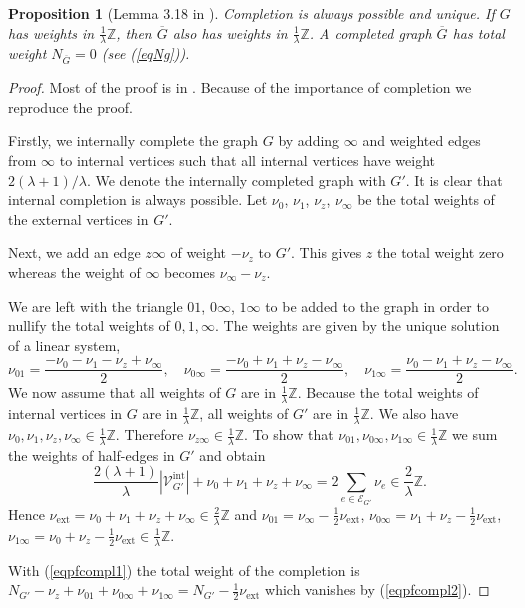 \documentclass[oneside]{amsart}
\newcommand{\ZZ}{{\mathbb Z}}
\newcommand{\Gg}{{\overline{G}}}
\newcommand{\sE}{\mathcal{E}}
\newcommand{\sV}{\mathcal{V}}
\theoremstyle{plain}
\newtheorem{prop}[thm]{Proposition}
\begin{document}
\begin{prop}[Lemma 3.18 in \cite{gf}]\label{propcompl}
Completion is always possible and unique. If $G$ has weights in $\frac{1}{\lambda}\ZZ$, then $\Gg$ also has weights in $\frac{1}{\lambda}\ZZ$. A completed graph $\Gg$ has total weight $N_\Gg=0$
(see (\ref{eqNg})).
\end{prop}
\begin{proof}
Most of the proof is in \cite{gf}. Because of the importance of completion we reproduce the proof.

Firstly, we internally complete the graph $G$ by adding $\infty$ and weighted edges from $\infty$ to internal vertices such that all internal vertices have weight $2(\lambda+1)/\lambda$.
We denote the internally completed graph with $G'$. It is clear that internal completion is always possible.
Let $\nu_0$, $\nu_1$, $\nu_z$, $\nu_\infty$ be the total weights of the external vertices in $G'$.

Next, we add an edge $z\infty$ of weight $-\nu_z$ to $G'$. This gives $z$ the total weight zero whereas the weight of $\infty$ becomes $\nu_\infty-\nu_z$.

We are left with the triangle $01$, $0\infty$, $1\infty$ to be added to the graph in order to nullify the total weights of $0,1,\infty$.
The weights are given by the unique solution of a linear system,
\begin{equation}\label{eqpfcompl1}
\nu_{01}=\frac{-\nu_0-\nu_1-\nu_z+\nu_\infty}{2},\quad\nu_{0\infty}=\frac{-\nu_0+\nu_1+\nu_z-\nu_\infty}{2},\quad\nu_{1\infty}=\frac{\nu_0-\nu_1+\nu_z-\nu_\infty}{2}.
\end{equation}
We now assume that all weights of $G$ are in $\frac{1}{\lambda}\ZZ$. Because the total weights of internal vertices in $G$ are in $\frac{1}{\lambda}\ZZ$, all weights of $G'$
are in $\frac{1}{\lambda}\ZZ$. We also have $\nu_0,\nu_1,\nu_z,\nu_\infty\in\frac{1}{\lambda}\ZZ$. Therefore $\nu_{z\infty}\in\frac{1}{\lambda}\ZZ$.
To show that $\nu_{01},\nu_{0\infty},\nu_{1\infty}\in\frac{1}{\lambda}\ZZ$ we sum the weights of half-edges in $G'$ and obtain
\begin{equation}\label{eqpfcompl2}
\frac{2(\lambda+1)}{\lambda}|\sV_{G'}^\text{int}|+\nu_0+\nu_1+\nu_z+\nu_\infty=2\sum_{e\in\sE_{G'}}\nu_e\in\frac{2}{\lambda}\ZZ.
\end{equation}
Hence $\nu_\text{ext}=\nu_0+\nu_1+\nu_z+\nu_\infty\in\frac{2}{\lambda}\ZZ$ and $\nu_{01}=\nu_\infty-\frac{1}{2}\nu_\text{ext}$, $\nu_{0\infty}=\nu_1+\nu_z-\frac{1}{2}\nu_\text{ext}$,
$\nu_{1\infty}=\nu_0+\nu_z-\frac{1}{2}\nu_\text{ext}\in\frac{1}{\lambda}\ZZ$.

With (\ref{eqpfcompl1}) the total weight of the completion is $N_{G'}-\nu_z+\nu_{01}+\nu_{0\infty}+\nu_{1\infty}=N_{G'}-\frac{1}{2}\nu_\text{ext}$ which vanishes by (\ref{eqpfcompl2}).
\end{proof}
\end{document}
